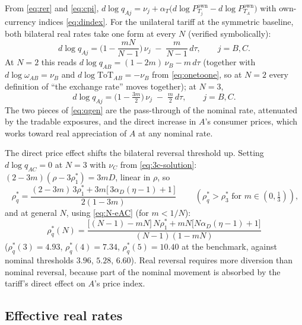 \documentclass[11pt]{article}
\begin{document}
From \eqref{eq:rer} and \eqref{eq:cpi}, $d\log q_{Aj} = \nu_j + \alpha_T\big( d\log P_{T_j}^{\mathrm{own}} - d\log P_{T_A}^{\mathrm{own}} \big)$ with own-currency indices \eqref{eq:dindex}. For the unilateral tariff at the symmetric baseline, both bilateral real rates take one form at every $N$ (verified symbolically):
\begin{equation}
d\log q_{Aj} = \Big( 1 - \frac{mN}{N-1} \Big)\, \nu_j \;-\; \frac{m}{N-1}\, d\tau,
\qquad j = B, C .
\label{eq:qgen}
\end{equation}
At $N = 2$ this reads $d\log q_{AB} = (1 - 2m)\, \nu_B - m\, d\tau$ (together with $d\log \omega_{AB} = \nu_B$ and $d\log \mathrm{ToT}_{AB} = -\nu_B$ from \eqref{eq:onetoone}, so at $N = 2$ every definition of ``the exchange rate'' moves together); at $N = 3$,
\begin{equation}
d\log q_{Aj} = \Big(1 - \tfrac{3m}{2}\Big)\, \nu_j \;-\; \tfrac{m}{2}\, d\tau,
\qquad j = B, C .
\label{eq:3c-dq}
\end{equation}
The two pieces of \eqref{eq:qgen} are the pass-through of the nominal rate, attenuated by the tradable exposures, and the direct increase in $A$'s consumer prices, which works toward real appreciation of $A$ at any nominal rate.

The direct price effect shifts the bilateral reversal threshold up. Setting $d\log q_{AC} = 0$ at $N = 3$ with $\nu_C$ from \eqref{eq:3c-solution}: $(2-3m)(\rho - 3\rho_1^*) = 3mD$, linear in $\rho$, so
\begin{equation}
\boxed{\;\rho^*_q = \frac{(2 - 3m)\, 3\rho_1^* + 3m\big[\,3\alpha_D(\eta-1) + 1\,\big]}{2(1 - 3m)}\;}
\qquad (\rho^*_q > \rho_3^* \text{ for } m \in (0, \tfrac{1}{3})) ,
\label{eq:3c-rhoq}
\end{equation}
and at general $N$, using \eqref{eq:N-eAC} (for $m < 1/N$):
\begin{equation}
\boxed{\;
\rho_q^*(N) = \frac{\big[(N-1) - mN\big]\, N\rho_1^* + mN\big[ N\alpha_D(\eta-1) + 1 \big]}{(N-1)(1 - mN)}
\;}
\label{eq:N-rhoq}
\end{equation}
($\rho_q^*(3) = 4.93$, $\rho_q^*(4) = 7.34$, $\rho_q^*(5) = 10.40$ at the benchmark, against nominal thresholds $3.96$, $5.28$, $6.60$). Real reversal requires more diversion than nominal reversal, because part of the nominal movement is absorbed by the tariff's direct effect on $A$'s price index.

\subsection{Effective real rates}
\end{document}

